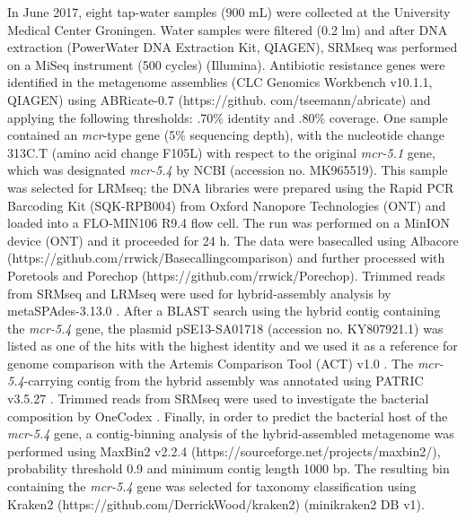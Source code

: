 In June 2017, eight tap-water samples (900 mL) were collected at the University Medical Center Groningen. 
Water samples were filtered (0.2 lm) and after DNA extraction (PowerWater DNA Extraction Kit, QIAGEN), SRMseq was performed on a MiSeq instrument (500 cycles) (Illumina). 
Antibiotic resistance genes were identified in the metagenome assemblies (CLC Genomics Workbench v10.1.1, QIAGEN) using ABRicate-0.7 (https://github.
com/tseemann/abricate) and applying the following thresholds:
.70\% identity and .80\% coverage. 
One sample contained an \textit{mcr}-type gene (5\% sequencing depth), with the nucleotide change 313C.T (amino acid change F105L) with respect to the original
\textit{mcr-5.1} gene, which was designated \textit{mcr-5.4} by NCBI (accession
no. MK965519). 
This sample was selected for LRMseq; the DNA libraries were prepared using the Rapid PCR Barcoding Kit (SQK-RPB004) from Oxford Nanopore Technologies (ONT) and
loaded into a FLO-MIN106 R9.4 flow cell. 
The run was performed on a MinION device (ONT) and it proceeded for 24 h. 
The data were basecalled using Albacore (https://github.com/rrwick/Basecallingcomparison) and further processed with Poretools \citep{loman_poretools_2014} and Porechop (https://github.com/rrwick/Porechop). 
Trimmed reads from SRMseq and LRMseq were used for hybrid-assembly analysis by
metaSPAdes-3.13.0 \citep{nurk_metaspades_2017}. 
After a BLAST search using the hybrid contig containing the \textit{mcr-5.4} gene, the plasmid pSE13-SA01718 (accession no. KY807921.1) was listed as one of the hits with the highest identity and we used it as a reference for genome comparison with the Artemis Comparison Tool (ACT) v1.0
\citep{carver_act_2005}. 
The \textit{mcr-5.4}-carrying contig from the hybrid assembly was annotated using PATRIC v3.5.27 \citep{wattam_improvements_2017}. 
Trimmed reads from SRMseq were used to investigate the bacterial composition by OneCodex \citep{minot_one_2015}. 
Finally, in order to predict the bacterial host of the \textit{mcr-5.4} gene, a contig-binning analysis of the hybrid-assembled metagenome was performed using MaxBin2 v2.2.4 (https://sourceforge.net/projects/maxbin2/), probability
threshold 0.9 and minimum contig length 1000 bp. 
The resulting bin containing the \textit{mcr-5.4} gene was selected for taxonomy classification using Kraken2 (https://github.com/DerrickWood/kraken2)
(minikraken2 DB v1).

